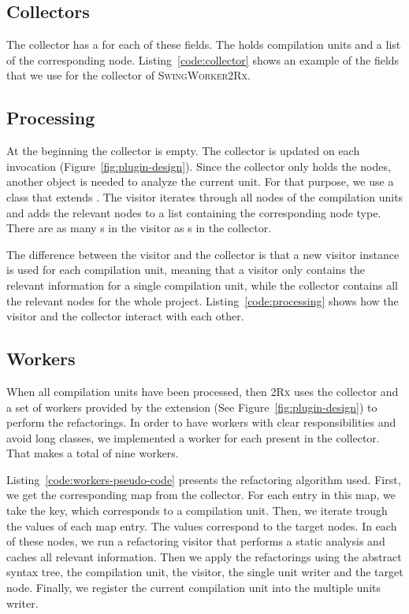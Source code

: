 \documentclass[type=bsc,accentcolor=tud9c]{tudthesis}
\newcommand{\toolcore}{\textsc{2Rx}}
\newcommand{\toolextension}{\textsc{SwingWorker2Rx}}
\begin{document}
\subsection{Collectors}
The collector has a  for each of these fields. The  holds compilation units and a list of the corresponding node. Listing~\ref{code:collector} shows an example of the fields that we use for the collector of \toolextension{}.



\subsection{Processing}
At the beginning the collector is empty. The collector is updated on each  invocation (Figure~\ref{fig:plugin-design}). Since the collector only holds the nodes, another object is needed to analyze the current unit. For that purpose, we use a class that extends . The visitor iterates through all nodes of the compilation units and adds the relevant nodes to a list containing the corresponding node type. There are as many s in the visitor as s in the collector.

The difference between the visitor and the collector is that a new visitor instance is used for each compilation unit, meaning that a visitor only contains the relevant information for a single compilation unit, while the collector contains all the relevant nodes for the whole project. Listing~\ref{code:processing} shows how the visitor and the collector interact with each other.



\subsection{Workers}
When all compilation units have been processed, then \toolcore{} uses the collector and a set of workers provided by the extension (See Figure~\ref{fig:plugin-design}) to perform the refactorings. In order to have workers with clear responsibilities and avoid long classes, we implemented a worker for each  present in the collector. That makes a total of nine workers.

Listing~\ref{code:workers-pseudo-code} presents the refactoring algorithm used. First, we get the corresponding map from the collector. For each entry in this map, we take the key, which corresponds to a compilation unit. Then, we iterate trough the values of each map entry. The values correspond to the target nodes. In each of these nodes, we run a refactoring visitor that performs a static analysis and caches all relevant information. Then we apply the refactorings using the abstract syntax tree, the compilation unit, the visitor, the single unit writer and the target node. Finally, we register the current compilation unit into the multiple units writer.
\end{document}
